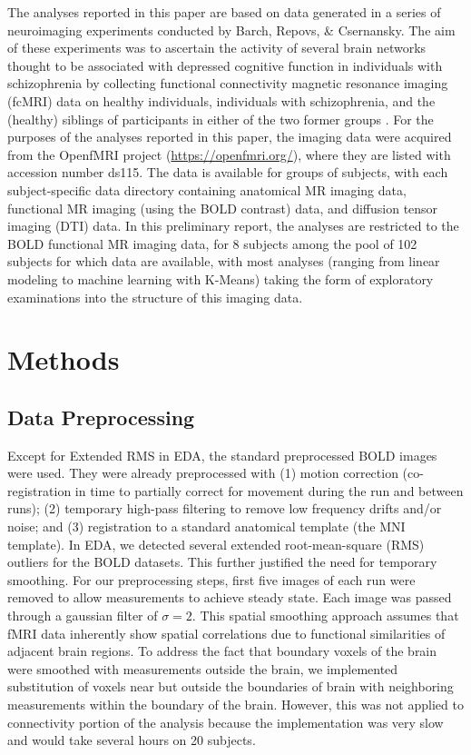 \documentclass[11pt]{article}
\begin{document}
The analyses reported in this paper are based on data generated in a series of
neuroimaging experiments conducted by Barch, Repovs, \& Csernansky. The aim of
these experiments was to ascertain the activity of several brain networks
thought to be associated with depressed cognitive function in individuals with
schizophrenia by collecting functional connectivity magnetic resonance imaging
(fcMRI) data on healthy individuals, individuals with schizophrenia, and the
(healthy) siblings of participants in either of the two former groups
\cite{repovs2012}. For the purposes of the analyses reported in this paper, the imaging
data were acquired from the OpenfMRI project (\url{https://openfmri.org/}), where they
are listed with accession number ds115. The data is available for groups of
subjects, with each subject-specific data directory containing anatomical MR
imaging data, functional MR imaging (using the BOLD contrast) data, and
diffusion tensor imaging (DTI) data. In this preliminary report, the analyses
are restricted to the BOLD functional MR imaging data, for 8 subjects among
the pool of 102 subjects for which data are available, with most analyses
(ranging from linear modeling to machine learning with K-Means) taking the form
of exploratory examinations into the structure of this imaging data.


\section{Methods}

\subsection{Data Preprocessing}

Except for Extended RMS in EDA, the standard preprocessed BOLD images were used. They were already preprocessed with (1) motion correction (co-registration in time to partially correct for movement during the run and between runs); (2) temporary high-pass filtering to remove low frequency drifts and/or noise; and (3) registration to a standard anatomical template (the MNI template). In EDA, we detected several extended root-mean-square (RMS) outliers for the BOLD datasets. This further justified the need for temporary smoothing. For our preprocessing steps, first five images of each run were removed to allow measurements to achieve steady state. Each image was passed through a gaussian filter of $\sigma=2$. This spatial smoothing approach assumes that fMRI data inherently show spatial correlations due to functional similarities of adjacent brain regions. To address the fact that boundary voxels of the brain were smoothed with measurements outside the brain, we implemented substitution of voxels near but outside the boundaries of brain with neighboring measurements within the boundary of the brain. However, this was not applied to connectivity portion of the analysis because the implementation was very slow and would take several hours on 20 subjects.
\end{document}
